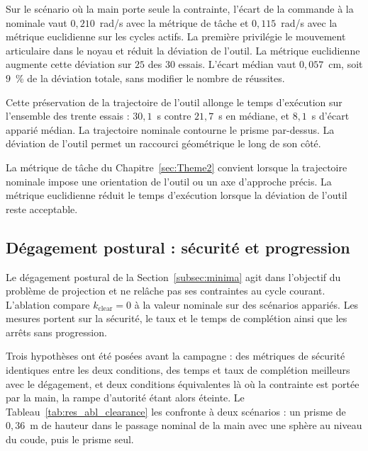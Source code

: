 Sur le scénario où la main porte seule la contrainte, l'écart de la commande à la nominale vaut $0{,}210$~rad/s avec la métrique de tâche et $0{,}115$~rad/s avec la métrique euclidienne sur les cycles actifs. La première privilégie le mouvement articulaire dans le noyau et réduit la déviation de l'outil. La métrique euclidienne augmente cette déviation sur $25$ des $30$ essais. L'écart médian vaut $0{,}057$~cm, soit $9$~\% de la déviation totale, sans modifier le nombre de réussites.

Cette préservation de la trajectoire de l'outil allonge le temps d'exécution sur l'ensemble des trente essais : $30{,}1$~s contre $21{,}7$~s en médiane, et $8{,}1$~s d'écart apparié médian. La trajectoire nominale contourne le prisme par-dessus. La déviation de l'outil permet un raccourci géométrique le long de son côté.

La métrique de tâche du Chapitre~\ref{sec:Theme2} convient lorsque la trajectoire nominale impose une orientation de l'outil ou un axe d'approche précis. La métrique euclidienne réduit le temps d'exécution lorsque la déviation de l'outil reste acceptable.

\subsection{Dégagement postural : sécurité et progression}\label{subsec:res_abl_clearance}
Le dégagement postural de la Section~\ref{subsec:minima} agit dans l'objectif du problème de projection et ne relâche pas ses contraintes au cycle courant. L'ablation compare $k_{\mathrm{clear}}=0$ à la valeur nominale sur des scénarios appariés. Les mesures portent sur la sécurité, le taux et le temps de complétion ainsi que les arrêts sans progression.

Trois hypothèses ont été posées avant la campagne : des métriques de sécurité identiques entre les deux conditions, des temps et taux de complétion meilleurs avec le dégagement, et deux conditions équivalentes là où la contrainte est portée par la main, la rampe d'autorité étant alors éteinte. Le Tableau~\ref{tab:res_abl_clearance} les confronte à deux scénarios : un prisme de $0{,}36$~m de hauteur dans le passage nominal de la main avec une sphère au niveau du coude, puis le prisme seul.

